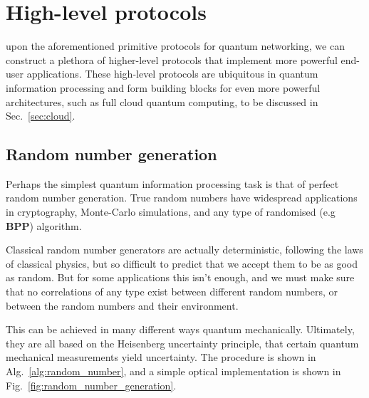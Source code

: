 \section{High-level protocols} 

 upon the aforementioned primitive protocols for quantum networking, we can construct a plethora of higher-level protocols that implement more powerful end-user applications. These high-level protocols are ubiquitous in quantum information processing and form building blocks for even more powerful architectures, such as full cloud quantum computing, to be discussed in Sec.~\ref{sec:cloud}.

%
%

\subsection{Random number generation} 

\newline

Perhaps the simplest quantum information processing task is that of perfect random number generation. True random numbers have widespread applications in cryptography, Monte-Carlo simulations, and any type of randomised (e.g \textbf{BPP}) algorithm.

Classical random number generators are actually deterministic, following the laws of classical physics, but so difficult to predict that we accept them to be as good as random. But for some applications this isn't enough, and we must make sure that no correlations of any type exist between different random numbers, or between the random numbers and their environment.

This can be achieved in many different ways quantum mechanically. Ultimately, they are all based on the Heisenberg uncertainty principle, that certain quantum mechanical measurements yield uncertainty. The procedure is shown in Alg.~\ref{alg:random_number}, and a simple optical implementation is shown in Fig.~\ref{fig:random_number_generation}.

